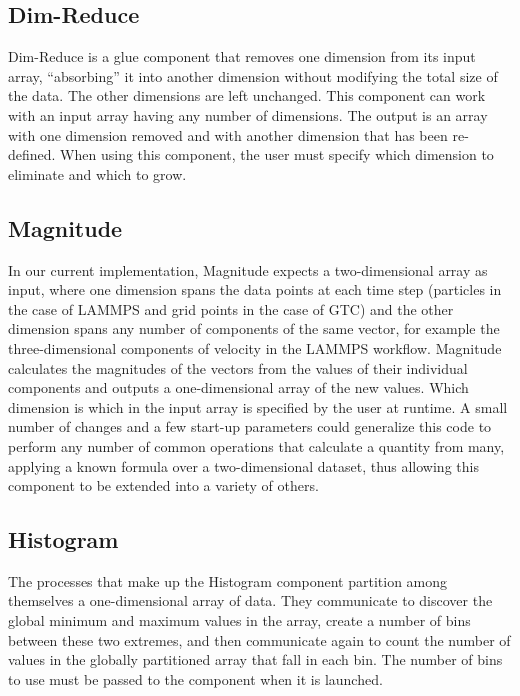 \subsection{Dim-Reduce}

Dim-Reduce is a glue component that removes one dimension from its
input array, ``absorbing'' it into another dimension without modifying the
total size of the data. The other dimensions are left unchanged. This component
can work with an input array having any number of dimensions. The output is an
array with one dimension removed and with another dimension that has been
re-defined. When using this component, the user must specify which
dimension to eliminate and which to grow.

\subsection{Magnitude}

In our current implementation, Magnitude expects a two-dimensional array as
input, where one dimension spans the data points at each time step (particles
in the case of LAMMPS and grid points in the case of GTC) and the other
dimension spans any number of components of the same vector, for example the
three-dimensional components of velocity in the LAMMPS workflow. Magnitude
calculates the magnitudes of the vectors from the values of their
individual components and outputs
a one-dimensional array of the new values. Which dimension is which in the input
array is specified by the user at runtime. A small number of changes and a few
start-up parameters could generalize this code to perform any number of
common operations that calculate a quantity from many,
applying a known formula over a two-dimensional dataset, thus
allowing this component to be extended into a variety of others.

\subsection{Histogram}

The processes that make up the Histogram component
partition among themselves a one-dimensional
array of data. They communicate to discover the global
minimum and maximum values in the array, create a
number of bins between these two extremes, and
then communicate again to count the number of values in the
globally partitioned array that fall in each bin.
The number of bins to use must be passed to the
component when it is launched.

